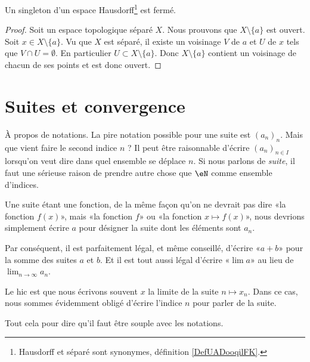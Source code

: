 \begin{lemma}	\label{LEMooXNSCooQYkmAN}
	Un singleton d'un espace Hausdorff\footnote{Hausdorff et séparé sont synonymes, définition \ref{DefUADooqilFK}.} est fermé.
\end{lemma}

\begin{proof}
	Soit un espace topologique séparé \( X\). Nous prouvons que \( X\setminus\{ a \} \) est ouvert. Soit \( x\in X\setminus\{ a \}\). Vu que \( X\) est séparé, il existe un voisinage \( V\) de \( a\) et \( U\) de \( x\) tels que \( V\cap U=\emptyset\). En particulier \( U\subset X\setminus\{ a \}\). Donc \( X\setminus\{ a \}\) contient un voisinage de chacun de ses points et est donc ouvert.
\end{proof}


\section{Suites et convergence}

\begin{normaltext}
	À propos de notations. La pire notation possible pour une suite est \( (a_n)_n\). Mais que vient faire le second indice \( n\) ? Il peut être raisonnable d'écrire \( (a_n)_{n\in I}\) lorsqu'on veut dire dans quel ensemble se déplace \( n\). Si nous parlons de \emph{suite}, il faut une sérieuse raison de prendre autre chose que \( \eN\) comme ensemble d'indices.

	Une suite étant une fonction, de la même façon qu'on ne devrait pas dire «la fonction \( f(x)\)», mais «la fonction \( f\)» ou «la fonction \( x\mapsto f(x)\)», nous devrions simplement écrire \( a\) pour désigner la suite dont les éléments sont \( a_n\).

	Par conséquent, il est parfaitement légal, et même conseillé, d'écrire «\( a+b\)» pour la somme des suites \( a\) et \( b\). Et il est tout aussi légal d'écrire «\( \lim a\)» au lieu de \( \lim_{n\to \infty} a_n\).

	Le hic est que nous écrivons souvent \( x\) la limite de la suite \( n\mapsto x_n\). Dans ce cas, nous sommes évidemment obligé d'écrire l'indice \( n\) pour parler de la suite.

	Tout cela pour dire qu'il faut être souple avec les notations.
\end{normaltext}


